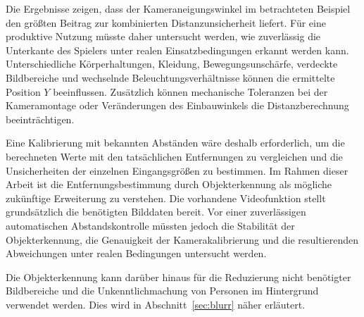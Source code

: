 Die Ergebnisse zeigen, dass der Kameraneigungswinkel im betrachteten Beispiel den größten Beitrag zur kombinierten Distanzunsicherheit liefert. Für eine produktive Nutzung müsste daher untersucht werden, wie zuverlässig die Unterkante des Spielers unter realen Einsatzbedingungen erkannt werden kann. 
Unterschiedliche Körperhaltungen, Kleidung, Bewegungsunschärfe, verdeckte Bildbereiche und wechselnde Beleuchtungsverhältnisse können die ermittelte Position \(Y\) beeinflussen. Zusätzlich können mechanische Toleranzen bei der Kameramontage oder Veränderungen des Einbauwinkels die Distanzberechnung beeinträchtigen. 

Eine Kalibrierung mit bekannten Abständen wäre deshalb erforderlich, um die berechneten Werte mit den tatsächlichen Entfernungen zu vergleichen und die Unsicherheiten der einzelnen Eingangsgrößen zu bestimmen. 
Im Rahmen dieser Arbeit ist die Entfernungsbestimmung durch Objekterkennung als mögliche zukünftige Erweiterung zu verstehen. Die vorhandene Videofunktion stellt grundsätzlich die benötigten Bilddaten bereit. 
Vor einer zuverlässigen automatischen Abstandskontrolle müssten jedoch die Stabilität der Objekterkennung, die Genauigkeit der Kamerakalibrierung und die resultierenden Abweichungen unter realen Bedingungen untersucht werden. 

Die Objekterkennung kann darüber hinaus für die Reduzierung nicht benötigter Bildbereiche und die Unkenntlichmachung von Personen im Hintergrund verwendet werden. Dies wird in Abschnitt~\ref{sec:blurr} näher erläutert.

\newpage